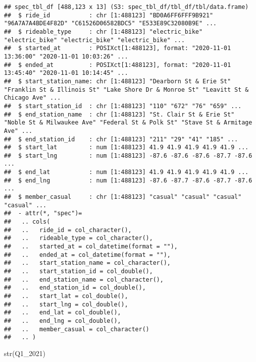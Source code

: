 \documentclass[
]{article}
\newenvironment{Shaded}{\begin{snugshade}}{\end{snugshade}}
\newcommand{\FunctionTok}[1]{\textcolor[rgb]{0.00,0.00,0.00}{#1}}
\newcommand{\NormalTok}[1]{#1}
\begin{document}
\begin{verbatim}
## spec_tbl_df [488,123 x 13] (S3: spec_tbl_df/tbl_df/tbl/data.frame)
##  $ ride_id           : chr [1:488123] "BD0A6FF6FFF9B921" "96A7A7A4BDE4F82D" "C61526D06582BDC5" "E533E89C32080B9E" ...
##  $ rideable_type     : chr [1:488123] "electric_bike" "electric_bike" "electric_bike" "electric_bike" ...
##  $ started_at        : POSIXct[1:488123], format: "2020-11-01 13:36:00" "2020-11-01 10:03:26" ...
##  $ ended_at          : POSIXct[1:488123], format: "2020-11-01 13:45:40" "2020-11-01 10:14:45" ...
##  $ start_station_name: chr [1:488123] "Dearborn St & Erie St" "Franklin St & Illinois St" "Lake Shore Dr & Monroe St" "Leavitt St & Chicago Ave" ...
##  $ start_station_id  : chr [1:488123] "110" "672" "76" "659" ...
##  $ end_station_name  : chr [1:488123] "St. Clair St & Erie St" "Noble St & Milwaukee Ave" "Federal St & Polk St" "Stave St & Armitage Ave" ...
##  $ end_station_id    : chr [1:488123] "211" "29" "41" "185" ...
##  $ start_lat         : num [1:488123] 41.9 41.9 41.9 41.9 41.9 ...
##  $ start_lng         : num [1:488123] -87.6 -87.6 -87.6 -87.7 -87.6 ...
##  $ end_lat           : num [1:488123] 41.9 41.9 41.9 41.9 41.9 ...
##  $ end_lng           : num [1:488123] -87.6 -87.7 -87.6 -87.7 -87.6 ...
##  $ member_casual     : chr [1:488123] "casual" "casual" "casual" "casual" ...
##  - attr(*, "spec")=
##   .. cols(
##   ..   ride_id = col_character(),
##   ..   rideable_type = col_character(),
##   ..   started_at = col_datetime(format = ""),
##   ..   ended_at = col_datetime(format = ""),
##   ..   start_station_name = col_character(),
##   ..   start_station_id = col_double(),
##   ..   end_station_name = col_character(),
##   ..   end_station_id = col_double(),
##   ..   start_lat = col_double(),
##   ..   start_lng = col_double(),
##   ..   end_lat = col_double(),
##   ..   end_lng = col_double(),
##   ..   member_casual = col_character()
##   .. )
\end{verbatim}

\begin{Shaded}
\begin{Highlighting}[]
  \FunctionTok{str}\NormalTok{(Q1\_2021)}
\end{Highlighting}
\end{Shaded}
\end{document}

